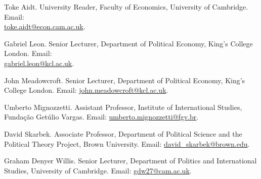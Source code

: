 \documentclass[a4paper]{article}
\renewenvironment{itemize}{
	\begin{list}{}{
			\setlength{\leftmargin}{1.5em}
		}
		}{
	\end{list}
}
\begin{document}
	\begin{itemize}

		\item Toke Aidt. University Reader, Faculty of Economics, University of Cambridge. Email: \\ \href{mailto:toke.aidt@econ.cam.ac.uk}{toke.aidt@econ.cam.ac.uk}.
		\item Gabriel Leon. Senior Lecturer, Department of Political Economy, King's College London. Email: \\ \href{mailto:gabriel.leon@kcl.ac.uk}{gabriel.leon@kcl.ac.uk}.
		\item John Meadowcroft. Senior Lecturer, Department of Political Economy, King's College London. Email: \href{mailto:john.meadowcroft@kcl.ac.uk}{john.meadowcroft@kcl.ac.uk}.
		\item Umberto Mignozzetti. Assistant Professor, Institute of International Studies, Funda\c{c}\~{a}o Get\'{u}lio Vargas. Email: \href{umberto.mignozzetti@fgv.br}{umberto.mignozzetti@fgv.br}.
		\item David Skarbek. Associate Professor, Department of Political Science and the Political Theory Project, Brown University. Email: \href{mailto:davidskarbek@gmail.com}{david\_skarbek@brown.edu}.
		\item Graham Denyer Willis. Senior Lecturer, Department of Politics and International Studies, University of Cambridge. Email: \href{mailto:gdw27@cam.ac.uk}{gdw27@cam.ac.uk}.
	\end{itemize}

	\bigskip


	
\end{document}
